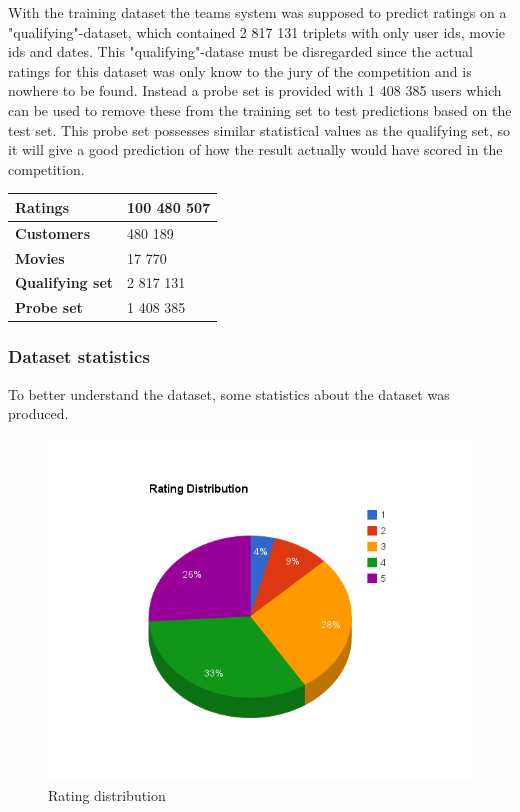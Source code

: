With the training dataset the teams system was supposed to predict ratings on a "qualifying"-dataset, which contained 2 817 131 triplets with only user ids, movie ids and dates. This "qualifying"-datase must be disregarded since the actual ratings for this dataset was only know to the jury of the competition and is nowhere to be found. Instead a probe set is provided with 1 408 385 users which can be used to remove these from the training set to test predictions based on the test set. This probe set possesses similar statistical values as the qualifying set, so it will give a good prediction of how the result actually would have scored in the competition.

\begin{center}
\begin{tabularx}{\textwidth}{ l X }
\hline
\textbf{Ratings} & 100 480 507 \\ \hline
\textbf{Customers} & 480 189 \\ \hline
\textbf{Movies} & 17 770 \\ \hline
\textbf{Qualifying set} & 2 817 131 \\ \hline
\textbf{Probe set} & 1 408 385 \\ \hline
\end{tabularx}
\label{tab:nfDatasetStat}
\end{center}


\subsubsection{Dataset statistics}

To better understand the dataset, some statistics about the dataset was produced.

\begin{figure}[H]
\includegraphics[width=5in]{image/ratingdistr.png}
\centering
\caption{Rating distribution}
\label{figure:ratingdistr}
\end{figure}

